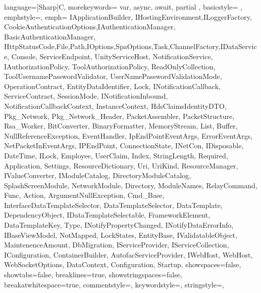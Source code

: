 {
	language=[Sharp]C,
	morekeywords={ var, async, await, partial }, %
	basicstyle=\ttfamily \color{black} \small \smaller,
	emphstyle={\color{vs_class}},
	emph={ IApplicationBuilder, IHostingEnvironment,ILoggerFactory, CookieAuthenticationOptions,IAuthenticationManager, BasicAuthenticationManager, HttpStatusCode,File,Path,IOptions,SpaOptions,Task,ChannelFactory,IDataService, Console, ServiceEndpoint, UnityServiceHost, NotificationService, IAuthorizationPolicy, ToolAuthorizationPolicy, ReadOnlyCollection, ToolUsernamePasswordValidator, UserNamePasswordValidationMode, OperationContract, EntityDataIdentifier, Lock, INotificationCallback, ServiceContract, SessionMode, INotificationInbound, NotificationCallbackContext, InstanceContext, HdsClaimsIdentityDTO, Pkg_Network, Pkg_Network_Header, PacketAssembler, PacketStructure, Rsa_Worker, BitConverter, BinaryFormatter, MemoryStream, List, Buffer, NullReferenceException, EventHandler, IpEndPointEventArgs, ErrorEventArgs, NetPacketInEventArgs, IPEndPoint, ConnectionState, INetCon, IDisposable, DateTime, ILock, Employee, UserClaim, Index, StringLength, Required, Application, Settings, ResourceDictionary, Uri, UriKind, ResourceManager, IValueConverter, IModuleCatalog, DirectoryModuleCatalog, SplashScreenModule, NetworkModule, Directory, ModuleNames, RelayCommand, Func, Action, ArgumentNullException, Cmd_Base, InterfaceDataTemplateSelector, DataTemplateSelector, DataTemplate, DependencyObject, IDataTemplateSelectable, FrameworkElement, DataTemplateKey, Type, INotifyPropertyChanged, INotifyDataErrorInfo, IBaseViewModel, NotMapped, LockStates, EntityBase, IValidatableObject, MaintenenceAmount, DbMigration, IServiceProvider, IServiceCollection, IConfiguration, ContainerBuilder, AutofacServiceProvider, IWebHost, WebHost, WebSocketOptions, DataContext, Configuration, Startup}, %
	showspaces=false,
	showtabs=false,
	breaklines=true,
	showstringspaces=false,
	breakatwhitespace=true,
	commentstyle=\color{vs_comment},
	keywordstyle=\color{vs_keyword},
	stringstyle=\color{vs_string},
}

